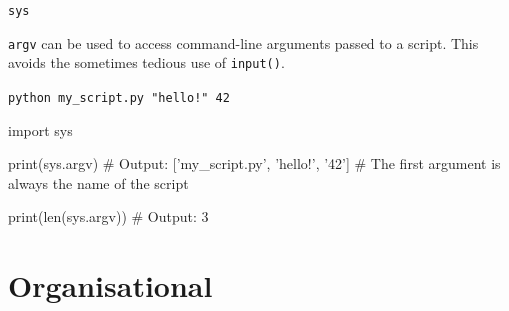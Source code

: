\begin{frame}[plain]
    \sectionpage
\end{frame}

\begin{frame}[fragile]{\texttt{sys}}

    \texttt{argv} can be used to access command-line arguments passed to a script. This avoids the sometimes tedious use of \texttt{input()}.

    \vspace{1em}

    \texttt{python my\_script.py "hello!" 42}

    \begin{pythoncode}

import sys

print(sys.argv)
# Output: ['my_script.py', 'hello!', '42']
# The first argument is always the name of the script

print(len(sys.argv))
# Output: 3

    \end{pythoncode}


\end{frame}


\section{Organisational}

\begin{frame}[plain]
    \sectionpage
\end{frame}

